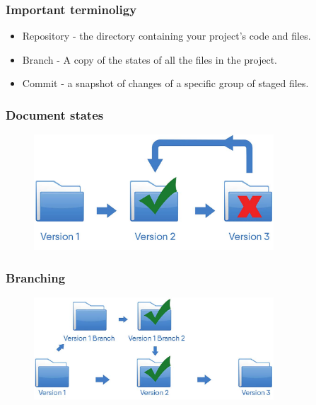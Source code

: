 \begin{frame}[t]
    \frametitle{Important terminoligy}
    
    \begin{itemize}
        \item Repository - the directory containing your project's code and files.
        \item Branch - A copy of the states of all the files in the project.
        \item Commit - a snapshot of changes of a specific group of staged files.
    \end{itemize}
\end{frame}

\begin{frame}
  \frametitle{Document states}
  \begin{figure}[htpb]
      \centering
      \includegraphics[width=0.8\textwidth]{images/singleton-vc.png}
  \end{figure}
\end{frame}

\begin{frame}
    \frametitle{Branching}
    \begin{figure}[htpb]
        \centering
        \includegraphics[width=0.8\textwidth]{images/branching-vc.png}
    \end{figure} 
\end{frame}

